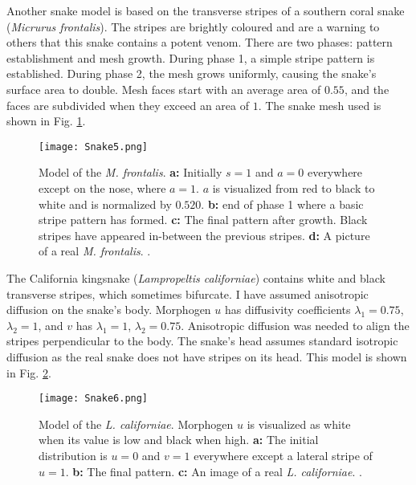 \newpage
Another snake model is based on the transverse stripes of a southern coral snake (\textit{Micrurus frontalis}). The stripes are brightly coloured and are a warning to others that this snake contains a potent venom. There are two phases: pattern establishment and mesh growth. During phase 1, a simple stripe pattern is established. During phase 2, the mesh grows uniformly, causing the snake's surface area to double. Mesh faces start with an average area of $0.55$, and the faces are subdivided when they exceed an area of $1$. The snake mesh used is shown in Fig. \ref{fig:Snake5}.

\begin{figure}[ht]
	\centering
	\texttt{[image: Snake5.png]}
	\caption[Model of the \textit{M. frontalis}]{Model of the \textit{M. frontalis}. \textbf{a:} Initially $s=1$ and $a=0$ everywhere except on the nose, where $a=1$. $a$ is visualized from red to black to white and is normalized by $0.520$. \textbf{b:} end of phase 1 where a basic stripe pattern has formed. \textbf{c:} The final pattern after growth. Black stripes have appeared in-between the previous stripes. \textbf{d:} A picture of a real \textit{M. frontalis}. .}
	\label{fig:Snake5}
\end{figure}
\newpage 

The California kingsnake (\textit{Lampropeltis californiae}) contains white and black transverse stripes, which sometimes bifurcate. I have assumed anisotropic diffusion on the snake's body. Morphogen $u$ has diffusivity coefficients $\lambda_{1}=0.75$, $\lambda_{2}=1$, and $v$ has $\lambda_{1}=1$, $\lambda_{2}=0.75$. Anisotropic diffusion was needed to align the stripes perpendicular to the body. The snake's head assumes standard isotropic diffusion as the real snake does not have stripes on its head. This model is shown in Fig. \ref{fig:Snake6}.

\begin{figure}[ht]
	\centering
	\texttt{[image: Snake6.png]}
	\caption[Model of the \textit{L. californiae}]{Model of the \textit{L. californiae}. Morphogen $u$ is visualized as white when its value is low and black when high. \textbf{a:} The initial distribution is $u=0$ and $v=1$ everywhere except a lateral stripe  of $u=1$. \textbf{b:} The final pattern. \textbf{c:} An image of a real \textit{L. californiae}. .}
	\label{fig:Snake6}
\end{figure}

